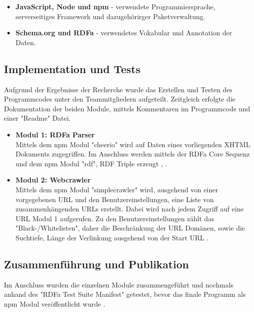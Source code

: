 \documentclass[hidelinks, a4paper, 11pt]{article} %
\begin{document}
\begin{itemize}
\item \textbf{JavaScript, Node und npm} - verwendete Programmiersprache, serverseitiges Framework und dazugeh\"orirger Paketverwaltung.
\item \textbf{Schema.org und RDFa} - verwendetes Vokabular und Annotation der Daten.
\end{itemize}


\subsection{Implementation und Tests}

Aufgrund der Ergebnisse der Recherche wurde das Erstellen und Testen des Programmcodes unter den Teammitgliedern aufgeteilt. Zeitgleich erfolgte die Dokumentation der beiden Module, mittels Kommentaren im Programmcode und einer "Readme" Datei. 

\begin{itemize}
\item \textbf{Modul 1: RDFa Parser} \\
Mittels dem npm Modul "cheerio" wird auf Daten eines vorliegenden XHTML Dokuments zugegriffen. Im Anschluss werden mittels der RDFa Core Sequenz und dem npm Modul "rdf", RDF Triple erzeugt \cite{cheerioModule}, \cite{rdfModule}. 

\item \textbf{Modul 2: Webcrawler} \\
Mittels dem npm Modul "simplecrawler" wird, ausgehend von einer vorgegebenen URL und den Benutzereinstellungen, eine Liste von zusammenh\"angenden URLs erstellt. Dabei wird nach jedem Zugriff auf eine URL Modul 1 aufgerufen. Zu den Benutzereinstellungen z\"ahlt das "Black-/Whitelisten", daher die Beschr\"ankung der URL Dom\"anen, sowie die Suchtiefe, L\"ange der Verlinkung ausgehend von der Start URL \cite{simplecrawlerModule}.
\end{itemize}

\subsection{Zusammenf\"uhrung und Publikation}

Im Anschluss wurden die einzelnen Module zusammengef\"uhrt und nochmals anhand des "RDFa Test Suite Manifest" getestet, bevor das finale Programm als npm Modul ver\"offentlicht wurde \cite{rdfaTest}.


\end{document}
